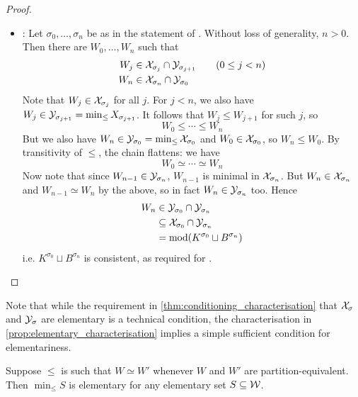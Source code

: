 \begin{proof}
\begin{itemize}
    \item \acyc{}: Let $\sigma_0, \ldots, \sigma_n$ be as in the statement
          of \acyc{}. Without loss of generality, $n > 0$. Then there are
          $W_0, \ldots, W_n$ such that
          \begin{align*}
            W_j &\in \mathcal{X}_{\sigma_j} \cap \mathcal{Y}_{\sigma_{j+1}} \qquad (0 \le j < n) \\
            W_n &\in \mathcal{X}_{\sigma_n} \cap \mathcal{Y}_{\sigma_0}
          \end{align*}
          Note that $W_j \in \mathcal{X}_{\sigma_j}$ for all $j$. For $j < n$, we also
          have $W_j \in \mathcal{Y}_{\sigma_{j+1}} = \min_{\le}{X_{\sigma_{j+1}}}$. It
          follows that $W_j \le W_{j+1}$ for such $j$, so
          \[
            W_0 \le \cdots \le W_n
          \]
          But we also have $W_n \in \mathcal{Y}_{\sigma_0} = \min_{\le}{\mathcal{X}_{\sigma_0}}$
          and $W_0 \in \mathcal{X}_{\sigma_0}$, so $W_n \le W_0$. By transitivity of
          $\le$, the chain flattens: we have
          \[
            W_0 \simeq \cdots \simeq W_n
          \]
          Now note that since $W_{n-1} \in \mathcal{Y}_{\sigma_n}$, $W_{n - 1}$ is
          minimal in $\mathcal{X}_{\sigma_n}$. But $W_n \in \mathcal{X}_{\sigma_n}$ and $W_{n -
          1} \simeq W_n$ by the above, so in fact $W_n \in \mathcal{Y}_{\sigma_n}$ too.
          Hence
          \begin{align*}
            W_n
            &\in \mathcal{Y}_{\sigma_0} \cap \mathcal{Y}_{\sigma_n} \\
            &\subseteq \mathcal{X}_{\sigma_0} \cap \mathcal{Y}_{\sigma_n} \\
            &= \operatorname{mod}(K^{\sigma_0} \sqcup B^{\sigma_n})
          \end{align*}
          i.e. $K^{\sigma_0} \sqcup B^{\sigma_n}$ is consistent, as required
          for \acyc{}.
\end{itemize}

\end{proof}

Note that while the requirement in \cref{thm:conditioning_characterisation}
that $\mathcal{X}_{\sigma}$ and $\mathcal{Y}_{\sigma}$ are elementary is a technical
condition,\footnotemark{} the characterisation in
\cref{prop:elementary_characterisation} implies a simple sufficient condition
for elementariness.
%

\begin{proposition}
    \label{prop:partition_equiv_tpo_implies_elementariness}
    Suppose $\le$ is such that $W \simeq W'$ whenever $W$ and $W'$ are
    partition-equivalent. Then $\min_{\le}{S}$ is elementary for any
    elementary set $S \subseteq \mathcal{W}$.
\end{proposition}

